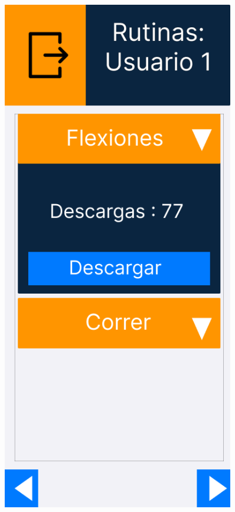 \newpage

\begin{figure}[H]
   \centering
   \begin{minipage}{0.45\textwidth}
      \centering
      \includegraphics[width=0.9\textwidth]{fotos/Frame 56.png}

\end{minipage}
\end{figure}
